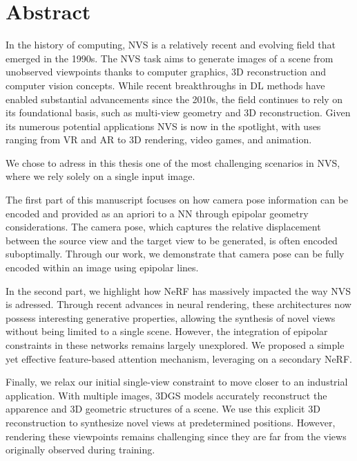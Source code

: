 \cleardoublepage
\setcounter{page}{1}

\chapter{Abstract}
In the history of computing, \ac{NVS} is a relatively recent and evolving field that emerged in the 1990s. The \ac{NVS} task aims to generate images of a scene from unobserved viewpoints thanks to computer graphics, 3D reconstruction and computer vision concepts. While recent breakthroughs in \ac{DL} methods have enabled substantial advancements since the 2010s, the field continues to rely on its foundational basis, such as multi-view geometry and 3D reconstruction. Given its numerous potential applications \ac{NVS} is now in the spotlight, with uses ranging from \ac{VR} and \ac{AR} to 3D rendering, video games, and animation.

We chose to adress in this thesis one of the most challenging scenarios in \ac{NVS}, where we rely solely on a single input image. 

The first part of this manuscript focuses on how camera pose information can be encoded and provided as an apriori to a \ac{NN} through epipolar geometry considerations. The camera pose, which captures the relative displacement between the source view and the target view to be generated, is often encoded suboptimally. Through our work, we demonstrate that camera pose can be fully encoded within an image using epipolar lines. 

In the second part, we highlight how \ac{NeRF} has massively impacted the way \ac{NVS} is adressed. Through recent advances in neural rendering, these architectures now possess interesting generative properties, allowing the synthesis of novel views without being limited to a single scene. However, the integration of epipolar constraints in these networks remains largely unexplored. We proposed a simple yet effective feature-based attention mechanism, leveraging on a secondary \ac{NeRF}. 

Finally, we relax our initial single-view constraint to move closer to an industrial application. With multiple images, 3D\ac{GS} models accurately reconstruct the apparence and 3D geometric structures of a scene. We use this explicit 3D reconstruction to synthesize novel views at predetermined positions. However, rendering these viewpoints remains challenging since they are far from the views originally observed during training. 

\cleardoublepage


